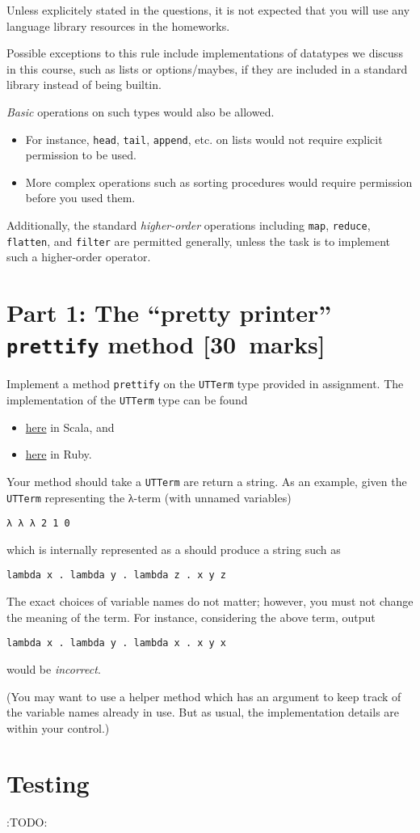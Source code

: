 \documentclass[11pt]{article}
\begin{document}
Unless explicitely stated in the questions,
it is not expected that you will use any language library resources
in the homeworks.

Possible exceptions to this rule include implementations
of datatypes we discuss in this course, such as lists
or options/maybes, if they are included in a standard library
instead of being builtin.

\emph{Basic} operations on such types would also be allowed.
\begin{itemize}
\item For instance, \texttt{head}, \texttt{tail}, \texttt{append}, etc. on lists
would not require explicit permission to be used.
\item More complex operations such as sorting procedures
would require permission before you used them.
\end{itemize}

Additionally, the standard \emph{higher-order} operations
including \texttt{map}, \texttt{reduce}, \texttt{flatten}, and \texttt{filter} are permitted generally,
unless the task is to implement such a higher-order operator.

\section*{Part 1: The “pretty printer” \texttt{prettify} method  [30 marks]}
\label{sec:org4b74ea6}
Implement a method \texttt{prettify} on the \texttt{UTTerm} type
provided in assignment.
The implementation of the \texttt{UTTerm} type can be found
\begin{itemize}
\item \href{./../assignments/src/a2\_ulterm.sc}{here} in Scala, and
\item \href{./../assignments/src/a2\_ulterm.rb}{here} in Ruby.
\end{itemize}

Your method should take a \texttt{UTTerm} are return a string.
As an example, given the \texttt{UTTerm} representing the
λ-term (with unnamed variables)
\begin{verbatim}
λ λ λ 2 1 0
\end{verbatim}
which is internally represented as a 
should produce a string such as
\begin{verbatim}
lambda x . lambda y . lambda z . x y z
\end{verbatim}

The exact choices of variable names do not matter;
however, you must not change the meaning of the term.
For instance, considering the above term, output
\begin{verbatim}
lambda x . lambda y . lambda x . x y x
\end{verbatim}
would be \emph{incorrect}.

(You may want to use a helper method which has an argument to
keep track of the variable names already in use.
But as usual, the implementation details are within your control.)

\section*{Testing}
\label{sec:orge1f7841}
:TODO:
\end{document}
